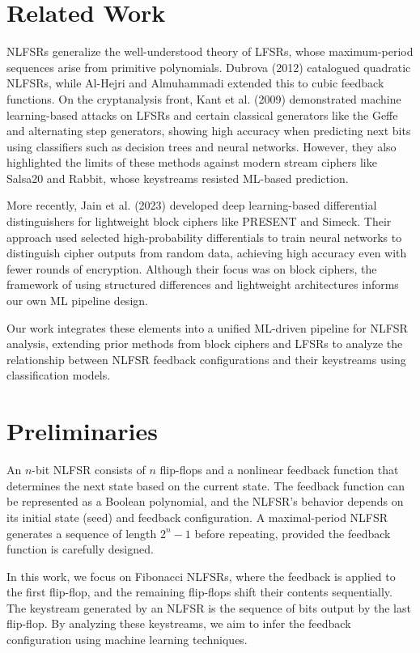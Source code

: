 \documentclass[conference]{IEEEtran}
\begin{document}
\section{Related Work}

NLFSRs generalize the well-understood theory of LFSRs, whose maximum-period sequences arise from primitive polynomials. Dubrova (2012) catalogued quadratic NLFSRs, while Al-Hejri and Almuhammadi extended this to cubic feedback functions. On the cryptanalysis front, Kant et al. (2009) demonstrated machine learning-based attacks on LFSRs and certain classical generators like the Geffe and alternating step generators, showing high accuracy when predicting next bits using classifiers such as decision trees and neural networks. However, they also highlighted the limits of these methods against modern stream ciphers like Salsa20 and Rabbit, whose keystreams resisted ML-based prediction.

More recently, Jain et al. (2023) developed deep learning-based differential distinguishers for lightweight block ciphers like PRESENT and Simeck. Their approach used selected high-probability differentials to train neural networks to distinguish cipher outputs from random data, achieving high accuracy even with fewer rounds of encryption. Although their focus was on block ciphers, the framework of using structured differences and lightweight architectures informs our own ML pipeline design.

Our work integrates these elements into a unified ML-driven pipeline for NLFSR analysis, extending prior methods from block ciphers and LFSRs to analyze the relationship between NLFSR feedback configurations and their keystreams using classification models.

\section{Preliminaries}
An $n$-bit NLFSR consists of $n$ flip-flops and a nonlinear feedback function that determines the next state based on the current state. The feedback function can be represented as a Boolean polynomial, and the NLFSR's behavior depends on its initial state (seed) and feedback configuration. A maximal-period NLFSR generates a sequence of length $2^n - 1$ before repeating, provided the feedback function is carefully designed.

In this work, we focus on Fibonacci NLFSRs, where the feedback is applied to the first flip-flop, and the remaining flip-flops shift their contents sequentially. The keystream generated by an NLFSR is the sequence of bits output by the last flip-flop. By analyzing these keystreams, we aim to infer the feedback configuration using machine learning techniques.
\end{document}
